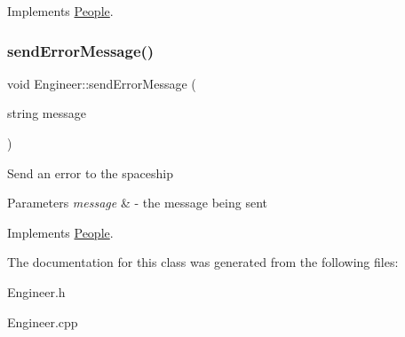 Implements \hyperlink{classPeople_a0685df78be631783138865e03cc7c85d}{People}.

\mbox{\label{classEngineer_ae60806f33b7f226891dbb7ad9b8a0c0b}} 
\subsubsection{\texorpdfstring{send\+Error\+Message()}{sendErrorMessage()}}
{\footnotesize\ttfamily void Engineer\+::send\+Error\+Message (\begin{DoxyParamCaption}\item[{string}]{message }\end{DoxyParamCaption})\hspace{0.3cm}{\ttfamily [virtual]}}

Send an error to the spaceship 
\begin{DoxyParams}{Parameters}
{\em message} & -\/ the message being sent \\
\hline
\end{DoxyParams}


Implements \hyperlink{classPeople_a572a35170f61d1848eb04b65baafb057}{People}.



The documentation for this class was generated from the following files\+:\begin{DoxyCompactItemize}
\item 
Engineer.\+h\item 
Engineer.\+cpp\end{DoxyCompactItemize}
